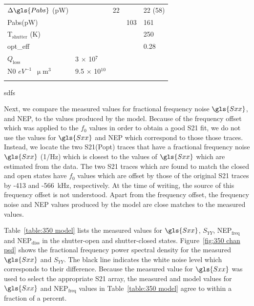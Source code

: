 \begin{table}[!htbp]
\begin{threeparttable}
\begin{tabular}{@{}lllll@{}}
$\Delta \gls{Pabs}$ (pW) &  & 22 &  & 22 (58) \\
\gls{Pabs}(pW) &  &  & 103 & 161 \\
T$_{\mathrm{shutter}}$ (K) &  &  &  & 250 \\
\gls{opt_eff} &  &  &  & 0.28 \\
$Q_{\mathrm{loss}}$  & 3 $\times$ 10$^{7}$ & & & \\
\gls{N0} $eV^{-1}$~$\upmu$m$^{3}$ & 9.5 $\times$ 10$^{10}$ &  &  &  \\ \dbottomrule
\\
\end{tabular}
\begin{tablenotes}
  \item sdfs
\vspace{2mm}
\end{tablenotes}
\end{threeparttable}
\end{table}

Next, we compare the measured values for fractional frequency noise $\gls{Sxx}$, and NEP, to the values produced by the model. Because of the frequency offset which was applied to the $f_{0}$ values in order to obtain a good \gls{S21} fit, we do not use the values for $\gls{Sxx}$ and NEP which correspond to those those traces. Instead, we locate the two \gls{S21}(\gls{Popt}) traces that have a fractional frequency noise $\gls{Sxx}$ (1/Hz) which is closest to the values of $\gls{Sxx}$ which are estimated from the data. The two \gls{S21} traces which are found to match the closed and open states have $f_{0}$ values which are offset by those of the original \gls{S21} traces by -413 and -566~kHz, respectively. At the time of writing, the source of this frequency offset is not understood. Apart from the frequency offset, the frequency noise and NEP values produced by the model are close matches to the measured values.

Table~\ref{table:350 model} lists the measured values for $\gls{Sxx}$, $S_{YY}$, NEP$_{\mathrm{freq}}$ and NEP$_{\mathrm{diss}}$ in the shutter-open and shutter-closed states. Figure~\ref{fig:350 chan psd} shows the fractional frequency power spectral density for the measured $\gls{Sxx}$ and $S_{YY}$. The black line indicates the white noise level which corresponds to their difference. Because the measured value for $\gls{Sxx}$ was used to select the appropriate \gls{S21} array, the measured and model values for $\gls{Sxx}$ and NEP$_{\mathrm{freq}}$ values in Table~\ref{table:350 model} agree to within a fraction of a percent.

